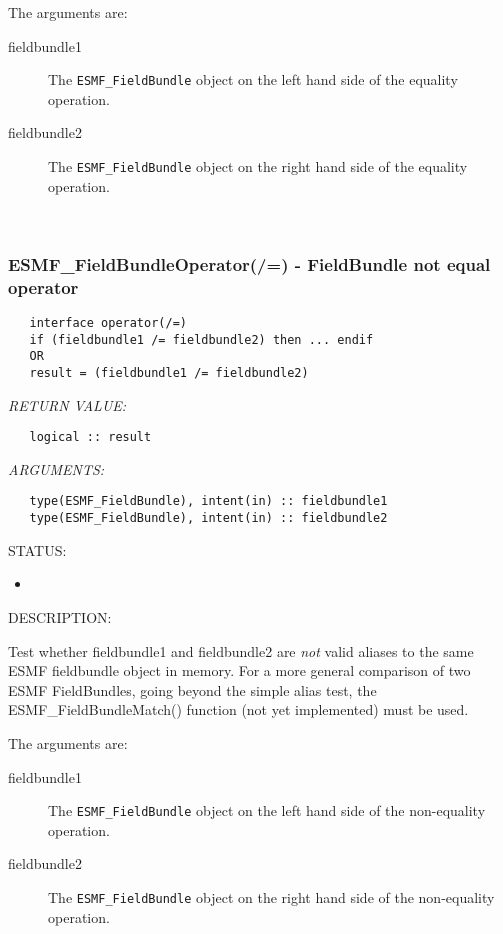    The arguments are:
   \begin{description}
   \item[fieldbundle1]
   The {\tt ESMF\_FieldBundle} object on the left hand side of the equality
   operation.
   \item[fieldbundle2]
   The {\tt ESMF\_FieldBundle} object on the right hand side of the equality
   operation.
   \end{description}
   
 
\mbox{}\hrulefill\ 
 
\subsubsection [ESMF\_FieldBundleOperator(/=)] {ESMF\_FieldBundleOperator(/=) - FieldBundle not equal operator}


  
\begin{verbatim}   interface operator(/=)
   if (fieldbundle1 /= fieldbundle2) then ... endif
   OR
   result = (fieldbundle1 /= fieldbundle2)\end{verbatim}{\em RETURN VALUE:}
\begin{verbatim}   logical :: result\end{verbatim}{\em ARGUMENTS:}
\begin{verbatim}   type(ESMF_FieldBundle), intent(in) :: fieldbundle1
   type(ESMF_FieldBundle), intent(in) :: fieldbundle2\end{verbatim}
{\sf STATUS:}
   \begin{itemize}
   \item{}
   \end{itemize}
  
{\sf DESCRIPTION:\\ }


   \begin{sloppypar}
   Test whether fieldbundle1 and fieldbundle2 are {\it not} valid aliases to the
   same ESMF fieldbundle object in memory. For a more general comparison of two ESMF
   FieldBundles, going beyond the simple alias test, the ESMF\_FieldBundleMatch() function
   (not yet implemented) must be used.
   \end{sloppypar}
  
   The arguments are:
   \begin{description}
   \item[fieldbundle1]
   The {\tt ESMF\_FieldBundle} object on the left hand side of the non-equality
   operation.
   \item[fieldbundle2]
   The {\tt ESMF\_FieldBundle} object on the right hand side of the non-equality
   operation.
   \end{description}
   
